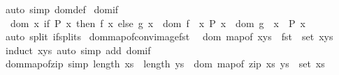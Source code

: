 \begin{isabellebody}
\isamarkupfalse%
\ {\isacharparenleft}{\kern0pt}auto\ simp{\isacharcolon}{\kern0pt}\ dom{\isacharunderscore}{\kern0pt}def{\isacharparenright}{\kern0pt}%
\endisatagproof
{\isafoldproof}%
%
\isadelimproof
\isanewline
%
\endisadelimproof
\isanewline
{}\isamarkupfalse%
\ dom{\isacharunderscore}{\kern0pt}if{\isacharcolon}{\kern0pt}\isanewline
\ \ {\isachardoublequoteopen}dom\ {\isacharparenleft}{\kern0pt}{\isasymlambda}x{\isachardot}{\kern0pt}\ if\ P\ x\ then\ f\ x\ else\ g\ x{\isacharparenright}{\kern0pt}\ {\isacharequal}{\kern0pt}\ dom\ f\ {\isasyminter}\ {\isacharbraceleft}{\kern0pt}x{\isachardot}{\kern0pt}\ P\ x{\isacharbraceright}{\kern0pt}\ {\isasymunion}\ dom\ g\ {\isasyminter}\ {\isacharbraceleft}{\kern0pt}x{\isachardot}{\kern0pt}\ {\isasymnot}\ P\ x{\isacharbraceright}{\kern0pt}{\isachardoublequoteclose}\isanewline
%
\isadelimproof
\ \ %
\endisadelimproof
%
\isatagproof
{}\isamarkupfalse%
\ {\isacharparenleft}{\kern0pt}auto\ split{\isacharcolon}{\kern0pt}\ if{\isacharunderscore}{\kern0pt}splits{\isacharparenright}{\kern0pt}%
\endisatagproof
{\isafoldproof}%
%
\isadelimproof
\isanewline
%
\endisadelimproof
\isanewline
{}\isamarkupfalse%
\ dom{\isacharunderscore}{\kern0pt}map{\isacharunderscore}{\kern0pt}of{\isacharunderscore}{\kern0pt}conv{\isacharunderscore}{\kern0pt}image{\isacharunderscore}{\kern0pt}fst{\isacharcolon}{\kern0pt}\isanewline
\ \ {\isachardoublequoteopen}dom\ {\isacharparenleft}{\kern0pt}map{\isacharunderscore}{\kern0pt}of\ xys{\isacharparenright}{\kern0pt}\ {\isacharequal}{\kern0pt}\ fst\ {\isacharbackquote}{\kern0pt}\ set\ xys{\isachardoublequoteclose}\isanewline
%
\isadelimproof
\ \ %
\endisadelimproof
%
\isatagproof
{}\isamarkupfalse%
\ {\isacharparenleft}{\kern0pt}induct\ xys{\isacharparenright}{\kern0pt}\ {\isacharparenleft}{\kern0pt}auto\ simp\ add{\isacharcolon}{\kern0pt}\ dom{\isacharunderscore}{\kern0pt}if{\isacharparenright}{\kern0pt}%
\endisatagproof
{\isafoldproof}%
%
\isadelimproof
\isanewline
%
\endisadelimproof
\isanewline
{}\isamarkupfalse%
\ dom{\isacharunderscore}{\kern0pt}map{\isacharunderscore}{\kern0pt}of{\isacharunderscore}{\kern0pt}zip\ {\isacharbrackleft}{\kern0pt}simp{\isacharbrackright}{\kern0pt}{\isacharcolon}{\kern0pt}\ {\isachardoublequoteopen}length\ xs\ {\isacharequal}{\kern0pt}\ length\ ys\ {\isasymLongrightarrow}\ dom\ {\isacharparenleft}{\kern0pt}map{\isacharunderscore}{\kern0pt}of\ {\isacharparenleft}{\kern0pt}zip\ xs\ ys{\isacharparenright}{\kern0pt}{\isacharparenright}{\kern0pt}\ {\isacharequal}{\kern0pt}\ set\ xs{\isachardoublequoteclose}\isanewline

\end{isabellebody}
